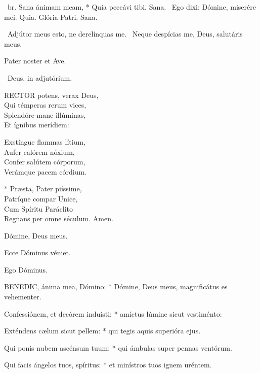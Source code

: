 \R\ br. Sana ánimam meam, * Quia peccávi tibi. Sana. \V\ Ego dixi: Dómine, miserére mei. Quia. Glória Patri. Sana.

\V\ Adjútor meus esto, ne derelínquas me. \R\ Neque despícias me, Deus, salutáris meus.



\sectionornament


Pater noster et Ave.

\V\ Deus, in adjutórium.


\lettrine[lines=2]{R}{ECTOR} potens, verax Deus,\\
Qui témperas rerum vices,\\
Splendóre mane illúminas,\\
Et ígnibus merídiem:

Exstíngue flammas lítium,\\
Aufer calórem nóxium,\\
Confer salútem córporum,\\
Verámque pacem córdium.

* Præsta, Pater piíssime,\\
Patríque compar Unice,\\
Cum Spíritu Paráclito\\
Regnans per omne séculum. Amen.

  Dómine, Deus meus.


  Ecce Dóminus véniet.

  Ego Dóminus.


\lettrine[lines=2]{B}{ENEDIC}, ánima mea, Dómino: * Dómine, Deus meus, magnificátus es vehementer.

Confessiónem, et decórem induísti: * amíctus lúmine sicut vestiménto:

Exténdens cælum sicut pellem: * qui tegis aquis superióra ejus.

Qui ponis nubem ascénsum tuum: * qui ámbulas super pennas ventórum.

Qui facis ángelos tuos, spíritus: * et minístros tuos ignem uréntem.

